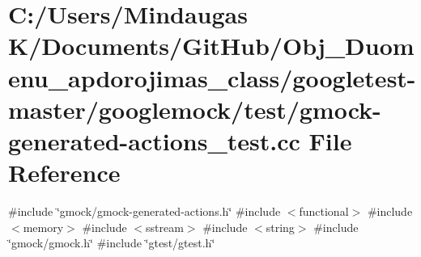 \hypertarget{googletest-master_2googlemock_2test_2gmock-generated-actions__test_8cc}{}\section{C\+:/\+Users/\+Mindaugas K/\+Documents/\+Git\+Hub/\+Obj\+\_\+\+Duomenu\+\_\+apdorojimas\+\_\+class/googletest-\/master/googlemock/test/gmock-\/generated-\/actions\+\_\+test.cc File Reference}
\label{googletest-master_2googlemock_2test_2gmock-generated-actions__test_8cc}
{\ttfamily \#include \char`\"{}gmock/gmock-\/generated-\/actions.\+h\char`\"{}}\newline
{\ttfamily \#include $<$functional$>$}\newline
{\ttfamily \#include $<$memory$>$}\newline
{\ttfamily \#include $<$sstream$>$}\newline
{\ttfamily \#include $<$string$>$}\newline
{\ttfamily \#include \char`\"{}gmock/gmock.\+h\char`\"{}}\newline
{\ttfamily \#include \char`\"{}gtest/gtest.\+h\char`\"{}}\newline
